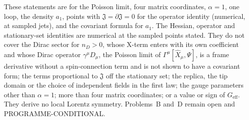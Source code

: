 These statements are for the Poisson limit, four matrix coordinates, \(\alpha=1\), one loop, the density \(a_1\), points with \(\mathfrak J=\partial\mathfrak J=0\) for the operator identity (numerical, at sampled jets), and the covariant formula for \(a_1\). The Hessian, operator and stationary-set identities are numerical at the sampled points stated. They do not cover the Dirac sector for \(n_D>0\), whose X-term enters with its own coefficient and whose Dirac operator \(\gamma^\mu D_\mu\), the Poisson limit of \(\Gamma^\mu[\hat X_\mu,\Psi]\), is a frame derivative without a spin-connection term and is not shown to have a covariant form; the terms proportional to \(\mathfrak J\) off the stationary set; the replica, the tip domain or the choice of independent fields in the first law; the gauge parameters other than \(\alpha=1\); more than four matrix coordinates; or a value or sign of \(G_{\mathrm{eff}}\). They derive no local Lorentz symmetry. Problems~B and~D remain open and PROGRAMME-CONDITIONAL.

